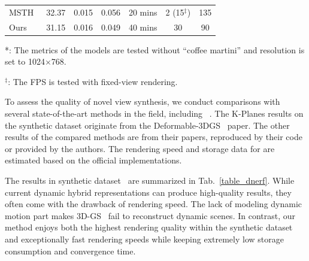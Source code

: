 \documentclass[10pt,twocolumn,letterpaper]{article}
\begin{document}
\begin{table}
{\begin{tabular}{l|ccc|c|cc}
MSTH~\cite{msth}&\cellcolor{yellow}32.37&\cellcolor{yellow}0.015&\cellcolor{yellow}0.056&\cellcolor{pink}20 mins & \cellcolor{yellow}2 (15$^\ddag$)&135\\
Ours& 31.15 & 0.016 &\cellcolor{pink}0.049 & 40 mins  &\cellcolor{pink}30 & \cellcolor{pink}90\\
\hline  
\end{tabular}  
}
 \begin{tablenotes}
        \footnotesize
        \item[*] *: The metrics of the models are tested without ``coffee martini'' and resolution is set to 1024$\times$768. 
        \item [$^\ddag$] $^\ddag$: The FPS is tested with fixed-view rendering.
        \end{tablenotes}\label{tab:dynerf}

\end{table}
To assess the quality of novel view synthesis, we conduct comparisons with several state-of-the-art methods in the field, including ~\cite{tineuvox,hexplane,kplanes,msth,3dgs,gan2023v4d,guo2023forwardflowfornvs,lin2023im4d,park2021nerfies,park2021hypernerf,song2023nerfplayer,attal2023hyperreel}.
The K-Planes results on the synthetic dataset originate from the Deformable-3DGS~\cite{yang2023deformable3dgs} paper. The other results of the compared methods are from their papers, reproduced by their code or provided by the authors. 
The rendering speed and storage data for \cite{kplanes, hexplane, tineuvox, 3dgs} are estimated based on the official implementations.


The results in synthetic dataset~\cite{pumarola2021dnerf} are summarized in Tab.~\ref{table_dnerf}. While current dynamic hybrid representations can produce high-quality results, they often come with the drawback of rendering speed. The lack of modeling dynamic motion part makes 3D-GS~\cite{3dgs} fail to reconstruct dynamic scenes. In contrast, our method enjoys both the highest rendering quality within the synthetic dataset and exceptionally fast rendering speeds while keeping extremely low storage consumption and convergence time.
\end{document}
